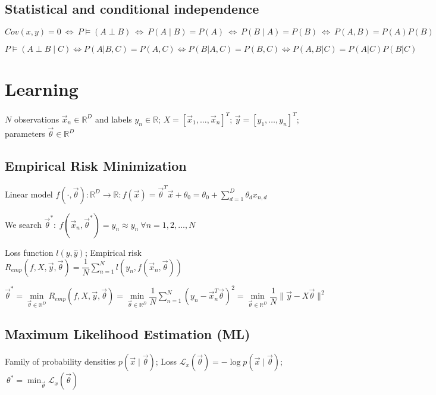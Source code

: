 \documentclass[]{article}
\begin{document}
	\subsection{Statistical and conditional independence}
	
	$Cov(x,y)=0 \ \Leftrightarrow \ P \models (A \perp B) \ \Leftrightarrow \ P(A \mid B)=P(A) \ \Leftrightarrow \ P(B \mid A)=P(B) \ \Leftrightarrow \ P(A,B)=P(A)P(B)$
	
	$P \models (A \perp B \mid C) \Leftrightarrow P(A|B,C) = P(A,C) \Leftrightarrow P(B|A,C) = P(B,C) \Leftrightarrow P(A,B|C) = P(A|C)P(B|C)$
	
	\section{Learning}
	
	$N$ observations $\vec{x}_n\in\mathbb{R}^D$ and labels $y_n\in\mathbb{R}$; $X=[\vec{x}_1,\dots,\vec{x}_n]^T$; $\vec{y}=[y_1,\dots,y_n]^T$; parameters $\vec{\theta}\in\mathbb{R}^{D}$
	
	\subsection{Empirical Risk Minimization}
	
	Linear model $f(\cdot,\vec{\theta}):\mathbb{R}^D\to\mathbb{R}:f(\vec{x})=\vec{\theta}^T \vec{x} + \theta_0 = \theta_0 + \sum\limits_{d=1}^D \theta_d x_{n,d}$
	
	We search $\vec{\theta}^* : \ f(\vec{x}_n, \vec{\theta}^*) = \hat{y}_n \approx y_n \ \forall n=1,2,\dots,N$
	
	Loss function $l(y, \hat{y})$; Empirical risk $R_{emp}(f,X,\vec{y},\vec{\theta})=\dfrac{1}{N}\sum\limits_{n=1}^N l(y_n,f(\vec{x}_n,\vec{\theta}))$
	
	$\vec{\theta}^* = \min\limits_{\vec{\theta} \in \mathbb{R}^D} R_{emp}(f,X,\vec{y},\vec{\theta}) = \min\limits_{\vec{\theta} \in \mathbb{R}^D} \dfrac{1}{N} \sum\limits_{n=1}^N (y_n - \vec{x}_n^T\vec{\theta})^2 = \min\limits_{\vec{\theta} \in \mathbb{R}^D} \dfrac{1}{N} \lVert \vec{y} - X \vec{\theta} \rVert^2$
	
	\subsection{Maximum Likelihood Estimation (ML)}
	
	Family of probability densities $p(\vec{x}\mid\vec{\theta})$;
	Loss $ \mathcal{L}_x(\vec{\theta}) = - \log p(\vec{x}\mid\vec{\theta})$;
	$\ \theta^* = \min_{\vec{\theta}} \mathcal{L}_x (\vec{\theta})$
	
\end{document}
